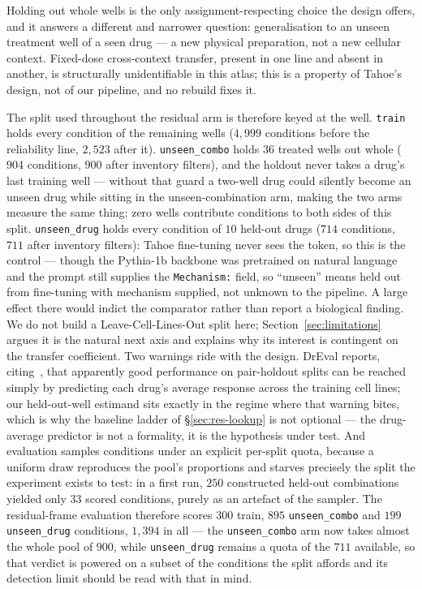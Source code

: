 Holding out whole wells is the only assignment-respecting choice the design offers, and it answers a
different and narrower question: generalisation to an unseen treatment well of a seen drug --- a new
physical preparation, not a new cellular context. Fixed-dose cross-context transfer, present in one
line and absent in another, is structurally unidentifiable in this atlas; this is a property of
Tahoe's design, not of our pipeline, and no rebuild fixes it.

The split used throughout the residual arm is therefore keyed at the well. \texttt{train} holds
every condition of the remaining wells ($4{,}999$ conditions before the reliability line, $2{,}523$
after it). \texttt{unseen\_combo} holds $36$ treated wells out whole ($904$ conditions, $900$ after
inventory filters), and the holdout never takes a drug's last training well --- without that guard a
two-well drug could silently become an unseen drug while sitting in the unseen-combination arm,
making the two arms measure the same thing; zero wells contribute conditions to both sides of this
split. \texttt{unseen\_drug} holds every condition of $10$ held-out drugs ($714$ conditions, $711$
after inventory filters): Tahoe fine-tuning never sees the token, so this is the control --- though
the Pythia-1b backbone was pretrained on natural language and the prompt still supplies the
\texttt{Mechanism:} field, so ``unseen'' means held out from fine-tuning with mechanism supplied, not
unknown to the pipeline. A large effect there would indict the comparator rather than report a
biological finding. We do not build a Leave-Cell-Lines-Out
split here; Section~\ref{sec:limitations} argues it is the natural next axis and explains why its
interest is contingent on the transfer coefficient. Two warnings ride with the design. DrEval
reports, citing~\cite{partin}, that apparently good performance on pair-holdout splits can be
reached simply by predicting each drug's average response across the training cell lines; our
held-out-well estimand sits exactly in the regime where that warning bites, which is why the
baseline ladder of \S\ref{sec:res-lookup} is not optional --- the drug-average predictor is not a
formality, it is the hypothesis under test. And evaluation samples conditions under an explicit
per-split quota, because a uniform draw reproduces the pool's proportions and starves precisely the
split the experiment exists to test: in a first run, $250$ constructed held-out combinations yielded
only $33$ scored conditions, purely as an artefact of the sampler. The residual-frame evaluation
therefore scores $300$ train, $895$ \texttt{unseen\_combo} and $199$ \texttt{unseen\_drug}
conditions, $1{,}394$ in all --- the \texttt{unseen\_combo} arm now takes almost the whole pool of
$900$, while \texttt{unseen\_drug} remains a quota of the $711$ available, so that verdict is
powered on a subset of the conditions the split affords and its detection limit should be read with
that in mind.


